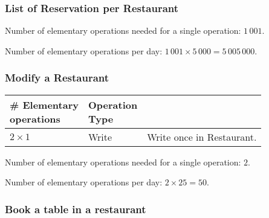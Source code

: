 \subsubsection{List of Reservation per Restaurant}


Number of elementary operations needed for a single operation: \(1\,001\).

Number of elementary operations per day: \(1\,001 \times 5\,000 = 5\,005\,000\).

\subsubsection{Modify a Restaurant}

\begin{tabular}{|l|l|l|}
	\hline
	\thead{\# Elementary\\operations} & \thead{Operation\\Type} & \thead{Justification} \\
	\hline
	\(2 \times 1\) & Write & Write once in Restaurant.\\
	\hline
\end{tabular}

Number of elementary operations needed for a single operation: \(2\).

Number of elementary operations per day: \(2 \times 25 = 50\).

\subsubsection{Book a table in a restaurant}

